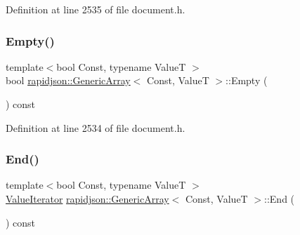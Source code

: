 Definition at line 2535 of file document.\+h.


\begin{DoxyCode}{0}

\end{DoxyCode}
\mbox{\label{classrapidjson_1_1_generic_array_aaa816f9b2ab65c842c343e5dbe99d876}} 
\subsubsection{\texorpdfstring{Empty()}{Empty()}}
{\footnotesize\ttfamily template$<$bool Const, typename ValueT $>$ \\
bool \mbox{\hyperlink{classrapidjson_1_1_generic_array}{rapidjson\+::\+Generic\+Array}}$<$ Const, ValueT $>$\+::Empty (\begin{DoxyParamCaption}{ }\end{DoxyParamCaption}) const}



Definition at line 2534 of file document.\+h.


\begin{DoxyCode}{0}

\end{DoxyCode}
\mbox{\label{classrapidjson_1_1_generic_array_a27e2a9f13adcca6e0f191495cdce9689}} 
\subsubsection{\texorpdfstring{End()}{End()}}
{\footnotesize\ttfamily template$<$bool Const, typename ValueT $>$ \\
\mbox{\hyperlink{classrapidjson_1_1_generic_array_ae94140e6dbab05cd3918d3e75819dc0a}{Value\+Iterator}} \mbox{\hyperlink{classrapidjson_1_1_generic_array}{rapidjson\+::\+Generic\+Array}}$<$ Const, ValueT $>$\+::End (\begin{DoxyParamCaption}{ }\end{DoxyParamCaption}) const}



